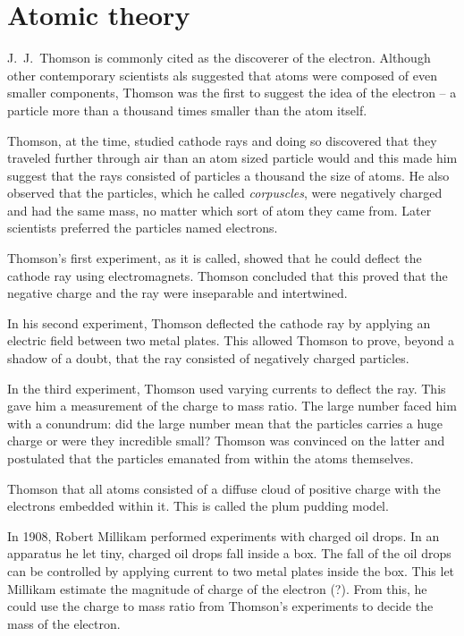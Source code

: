 \documentclass[../mit-general-chemistry.tex]{subfiles}
\begin{document}
\chapter{Atomic theory}

J.~J.~Thomson is commonly cited as the discoverer of the
electron. Although other contemporary scientists als suggested that
atoms were composed of even smaller components, Thomson was the first
to suggest the idea of the electron -- a particle more than a thousand
times smaller than the atom itself.

Thomson, at the time, studied cathode rays and doing so discovered
that they traveled further through air than an atom sized particle
would and this made him suggest that the rays consisted of particles a
thousand the size of atoms. He also observed that the particles, which
he called {\em corpuscles}, were negatively charged and had the same
mass, no matter which sort of atom they came from. Later scientists
preferred the particles named electrons.

Thomson's first experiment, as it is called, showed that he could
deflect the cathode ray using electromagnets. Thomson concluded that
this proved that the negative charge and the ray were inseparable and
intertwined.

In his second experiment, Thomson deflected the cathode ray by
applying an electric field between two metal plates. This allowed
Thomson to prove, beyond a shadow of a doubt, that the ray consisted
of negatively charged particles.

In the third experiment, Thomson used varying currents to deflect the
ray. This gave him a measurement of the charge to mass ratio. The
large number faced him with a conundrum: did the large number mean
that the particles carries a huge charge or were they incredible
small? Thomson was convinced on the latter and postulated that the
particles emanated from within the atoms themselves.

Thomson that all atoms consisted of a diffuse cloud of positive charge
with the electrons embedded within it. This is called the plum pudding
model.

In 1908, Robert Millikam performed experiments with charged oil
drops. In an apparatus he let tiny, charged oil drops fall inside a
box. The fall of the oil drops can be controlled by applying current
to two metal plates inside the box. This let Millikam estimate the
magnitude of charge of the electron (?). From this, he could use the
charge to mass ratio from Thomson's experiments to decide the mass of
the electron.
\end{document}
